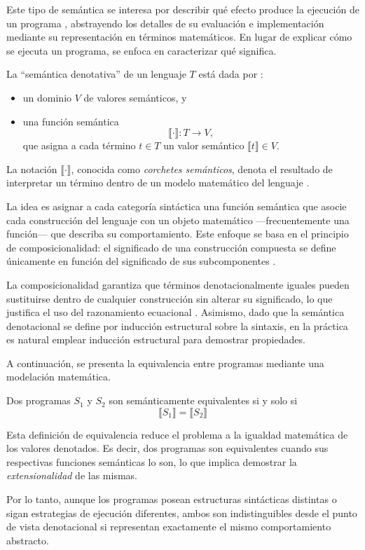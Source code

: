 Este tipo de semántica se interesa por describir qué efecto produce la ejecución de un programa \cite{nielson1992semantics}, abstrayendo los detalles de su evaluación e implementación mediante su representación en términos matemáticos. En lugar de explicar cómo se ejecuta un programa, se enfoca en caracterizar qué significa.

La \enquote{semántica denotativa} de  un lenguaje $T$ está dada por \cite{hutton2023semantics}:
\begin{itemize}
    \item un dominio $V$ de valores semánticos, y
    \item una función semántica 
    \[
        \llbracket \cdot \rrbracket : T \to V,
    \]
    que asigna a cada término $t \in T$ un valor semántico $\llbracket t \rrbracket \in V$.
\end{itemize}
La notación $\llbracket \cdot \rrbracket$, conocida como \emph{corchetes semánticos}, denota el resultado de interpretar un término dentro de un modelo matemático del lenguaje \cite{hutton2023semantics}.

La idea es asignar a cada categoría sintáctica una función semántica que asocie cada construcción del lenguaje con un objeto matemático ---frecuentemente una función--- que describa su comportamiento. Este enfoque se basa en el principio de composicionalidad: el significado de una construcción compuesta se define únicamente en función del significado de sus subcomponentes \cite{nielson1992semantics}.

La composicionalidad garantiza que términos denotacionalmente iguales pueden sustituirse dentro de cualquier construcción sin alterar su significado, lo que justifica el uso del razonamiento ecuacional \cite{hutton2023semantics}.  Asimismo, dado que la semántica denotacional se define por inducción estructural sobre la sintaxis, en la práctica es natural emplear inducción estructural para demostrar propiedades.  %

A continuación, se presenta la equivalencia entre programas mediante una modelación matemática.

\begin{definition}
Dos programas $S_1$ y $S_2$ son semánticamente  equivalentes si y solo si 
\[\llbracket S_1 \rrbracket  = \llbracket S_2 \rrbracket\]
\end{definition}

Esta definición de equivalencia reduce el problema a la igualdad matemática de los valores denotados. Es decir, dos programas son equivalentes cuando sus respectivas funciones semánticas lo son, lo que implica demostrar la \textit{extensionalidad} de las mismas. 

Por lo tanto, aunque los programas posean estructuras sintácticas distintas o sigan estrategias de ejecución diferentes, ambos son indistinguibles desde el punto de vista denotacional si representan exactamente el mismo comportamiento abstracto.

